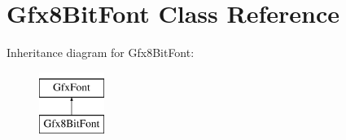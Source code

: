 \hypertarget{class_gfx8_bit_font}{}\section{Gfx8\+Bit\+Font Class Reference}
\label{class_gfx8_bit_font}
Inheritance diagram for Gfx8\+Bit\+Font\+:\begin{figure}[H]
\begin{center}
\leavevmode
\includegraphics[height=2.000000cm]{class_gfx8_bit_font}
\end{center}
\end{figure}
